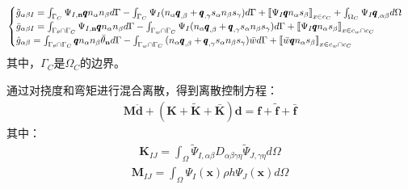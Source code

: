 \documentclass[a4paper]{article}
\begin{document}
\begin{equation}
    \begin{split}
    \begin{cases}
    {\tilde g}_{\alpha\beta I} = \int_{{\Gamma _C}}^{}{{\Psi _{I,{\bf{n}}}}{\pmb{q}}{n_\alpha }{n_\beta }d\Gamma }-\int_{{\Gamma _C}}^{}{{\Psi _I}({n_\alpha }{{\pmb{q}}_{,\beta }} + {{\pmb{q}}_{,\gamma }}{s_\alpha}{n_\beta }{s_\gamma})d\Gamma }  + {\left[\kern-0.15em\left[ {{\Psi _I}{\pmb{q}}{n_\alpha }{s_\beta }} 
     \right]\kern-0.15em\right]_{{{x}} \in {c_C}}} + \int_{{\Omega _C}}^{} {{\Psi _I}{{\pmb{q}}_{,\alpha \beta }}d\Omega } \\
    {\bar g}_{\alpha \beta I} = \int_{{\Gamma _\theta } \cap {\Gamma _C}}^{} {{\Psi _{I,{\bf{n}}}}{\pmb{q}}{n_\alpha }{n_\beta }d\Gamma }  - \int_{{\Gamma _w} \cap {\Gamma _C}}^{} {{\Psi _I}({n_\alpha }{{\pmb{q}}_{,\beta }} + {{\pmb{q}}_{,\gamma }}{s_\alpha }{n_\beta }{s_\gamma })d\Gamma }  + {\left[\kern-0.15em\left[ {{\Psi _I}{\pmb{q}}{n_\alpha }{s_\beta }} 
     \right]\kern-0.15em\right]_{{{x}} \in {c_w} \cap {c_C}}}\\
    \hat{g}_{\alpha \beta }= \int_{{\Gamma _\theta } \cap {\Gamma _C}}^{} {{\pmb{q}}{n_\alpha }{n_\beta }{{\bar \theta }_{\bf{n}}}d\Gamma }  - \int_{{\Gamma _w} \cap {\Gamma _C}}^{} {({n_\alpha }{{\pmb{q}}_{,\beta }} + {{\pmb{q}}_{,\gamma }}{s_\alpha }{n_\beta }{s_\gamma })\bar wd\Gamma }  + {\left[\kern-0.15em\left[ {\bar w{\pmb{q}}{n_\alpha }{s_\beta }} 
     \right]\kern-0.15em\right]_{{{x}} \in {c_w} \cap {c_C}}}
     \end{cases}
    \end{split}
    \end{equation}
其中，$\Gamma_C$是$\Omega_C$的边界。\par
通过对挠度和弯矩进行混合离散，得到离散控制方程：
\begin{equation}
\begin{split}
    \pmb{M}\ddot{\pmb d}+(\pmb{K}+\pmb{\tilde{K}}+\pmb{\bar{K}})\pmb{d}=\pmb{f}+\pmb{\tilde{f}}+\pmb{\bar f}
\end{split}
\end{equation}
其中：
\begin{equation}
\begin{split}
    \pmb{K}_{IJ}=\int_{\Omega}\tilde{\Psi}_{I,\alpha\beta}D_{\alpha\beta\gamma\eta}\tilde{\Psi}_{J,\gamma\eta}d\Omega  
\end{split}
\end{equation}
\begin{equation}
\begin{split}
    \pmb{M}_{IJ}=\int_{\Omega}\Psi_I(\pmb{x})\rho h\Psi_J(\pmb{x})d\Omega
\end{split}
\end{equation}
\end{document}
